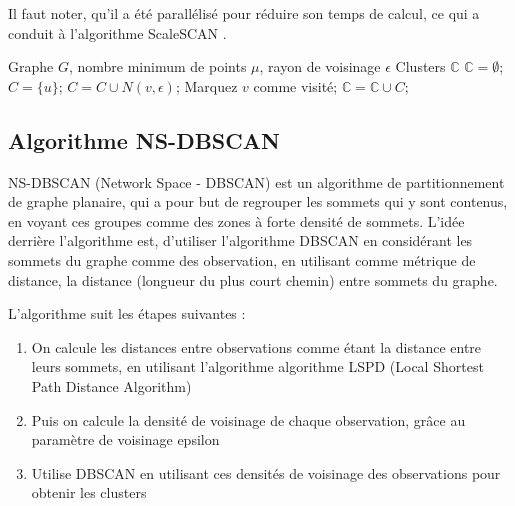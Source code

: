 \documentclass[12pt, french, latin.medieval, a4paper]{report}
\begin{document}
   		 Il faut noter, qu'il a été parallélisé pour réduire son temps de calcul, ce qui a conduit à l'algorithme ScaleSCAN \cite{shiokawa2018scalescan}.
   		 
   		 \begin{algorithm}[H]
   			 \caption{Pseudo code de SCAN \cite{shiokawa2018scalescan}}
   			 \label{alg:scan}
   			 \begin{algorithmic}[1]
   			 \REQUIRE Graphe $G$, nombre minimum de points $\mu$, rayon de voisinage $\epsilon$
   			 \ENSURE Clusters $\mathbb{C}$
   			 \STATE $\mathbb{C} = \emptyset $;
   				 \STATE $C = \{ u \}$;
   						 \STATE $C = C \cup N(v, \epsilon)$;
   						 \STATE Marquez $v$ comme visité;
   					 \ENDIF
   				 \ENDFOR
   					 \STATE $\mathbb{C} = \mathbb{C} \cup C$;
   				 \ENDIF
   			 \ENDFOR

   			 \end{algorithmic}
   		 \end{algorithm}
   		 
   	 \subsection{Algorithme NS-DBSCAN}

   		 NS-DBSCAN (Network Space - DBSCAN) \cite{wang2019ns} est un algorithme de partitionnement de graphe planaire, qui a pour but
   		 de regrouper les sommets qui y sont contenus, en voyant ces groupes comme des zones à forte densité de sommets.
   		 L'idée derrière l'algorithme est, d'utiliser l'algorithme DBSCAN en considérant les sommets du graphe comme des observation,
   		 en utilisant comme métrique de distance, la distance (longueur du plus court chemin) entre sommets du graphe.

   		 L'algorithme suit les étapes suivantes :
   		 \begin{enumerate}
   			 \item On calcule les distances entre observations comme étant la distance entre leurs sommets, en utilisant l'algorithme algorithme LSPD (Local Shortest Path Distance Algorithm) \cite{wang2019ns}
   			 \item Puis on calcule la densité de voisinage de chaque observation, grâce au paramètre de voisinage epsilon
   			 \item Utilise DBSCAN en utilisant ces densités de voisinage des observations pour obtenir les clusters
   		 \end{enumerate}
   	 
\end{document}
